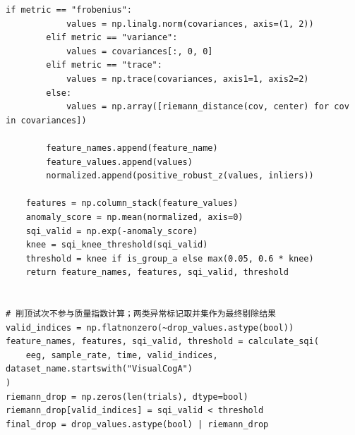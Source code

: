 \begin{lstlisting}[style=appendixPython]
        if metric == "frobenius":
            values = np.linalg.norm(covariances, axis=(1, 2))
        elif metric == "variance":
            values = covariances[:, 0, 0]
        elif metric == "trace":
            values = np.trace(covariances, axis1=1, axis2=2)
        else:
            values = np.array([riemann_distance(cov, center) for cov in covariances])

        feature_names.append(feature_name)
        feature_values.append(values)
        normalized.append(positive_robust_z(values, inliers))

    features = np.column_stack(feature_values)
    anomaly_score = np.mean(normalized, axis=0)
    sqi_valid = np.exp(-anomaly_score)
    knee = sqi_knee_threshold(sqi_valid)
    threshold = knee if is_group_a else max(0.05, 0.6 * knee)
    return feature_names, features, sqi_valid, threshold


# 削顶试次不参与质量指数计算；两类异常标记取并集作为最终剔除结果
valid_indices = np.flatnonzero(~drop_values.astype(bool))
feature_names, features, sqi_valid, threshold = calculate_sqi(
    eeg, sample_rate, time, valid_indices, dataset_name.startswith("VisualCogA")
)
riemann_drop = np.zeros(len(trials), dtype=bool)
riemann_drop[valid_indices] = sqi_valid < threshold
final_drop = drop_values.astype(bool) | riemann_drop

\end{lstlisting}
\clearpage
